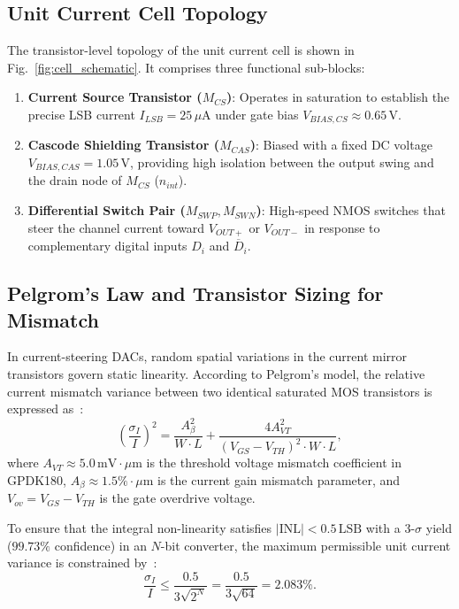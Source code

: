 \documentclass[conference,10pt]{IEEEtran}
\begin{document}
\subsection{Unit Current Cell Topology}
The transistor-level topology of the unit current cell is shown in Fig.~\ref{fig:cell_schematic}. It comprises three functional sub-blocks:
\begin{enumerate}
    \item \textbf{Current Source Transistor ($M_{CS}$)}: Operates in saturation to establish the precise LSB current $I_{LSB} = 25\,\mu\text{A}$ under gate bias $V_{BIAS,CS} \approx 0.65\,\text{V}$.
    \item \textbf{Cascode Shielding Transistor ($M_{CAS}$)}: Biased with a fixed DC voltage $V_{BIAS,CAS} = 1.05\,\text{V}$, providing high isolation between the output swing and the drain node of $M_{CS}$ ($n_{int}$).
    \item \textbf{Differential Switch Pair ($M_{SWP}, M_{SWN}$)}: High-speed NMOS switches that steer the channel current toward $V_{OUT+}$ or $V_{OUT-}$ in response to complementary digital inputs $D_i$ and $\overline{D}_i$.
\end{enumerate}

\subsection{Pelgrom's Law and Transistor Sizing for Mismatch}
In current-steering DACs, random spatial variations in the current mirror transistors govern static linearity. According to Pelgrom's model, the relative current mismatch variance between two identical saturated MOS transistors is expressed as~\cite{pelgrom_mismatch, albiol_mismatch_yield}:
\begin{equation}
\left( \frac{\sigma_I}{I} \right)^2 = \frac{A_\beta^2}{W \cdot L} + \frac{4 A_{VT}^2}{(V_{GS} - V_{TH})^2 \cdot W \cdot L},
\label{eq:pelgrom}
\end{equation}
where $A_{VT} \approx 5.0\,\text{mV}\cdot\mu\text{m}$ is the threshold voltage mismatch coefficient in GPDK180, $A_\beta \approx 1.5\%\cdot\mu\text{m}$ is the current gain mismatch parameter, and $V_{ov} = V_{GS} - V_{TH}$ is the gate overdrive voltage.

To ensure that the integral non-linearity satisfies $|\text{INL}| < 0.5\,\text{LSB}$ with a 3-$\sigma$ yield ($99.73\%$ confidence) in an $N$-bit converter, the maximum permissible unit current variance is constrained by~\cite{albiol_mismatch_yield}:
\begin{equation}
\frac{\sigma_I}{I} \le \frac{0.5}{3 \sqrt{2^N}} = \frac{0.5}{3 \sqrt{64}} = 2.083\%.
\label{eq:sigma_limit}
\end{equation}
\end{document}
